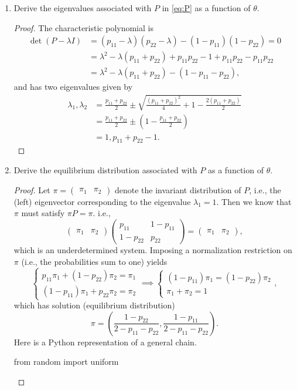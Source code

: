 \documentclass[oneside,reqno]{amsart}
\theoremstyle{definition}
\begin{document}
\begin{enumerate}[label=(\roman*)]
\item
Derive the eigenvalues associated with $P$ in \eqref{eq:P} as a function of $\theta$. 
\begin{proof}
The characteristic polynomial is
\begin{align*}
	\det(P - \lambda I) &= (p_{11} - \lambda )(p_{22} - \lambda) - (1-p_{11})(1-p_{22}) = 0 \\
	& = \lambda^2 - \lambda (p_{11} + p_{22}) + p_{11}p_{22} - 1 + p_{11} p_{22} - p_{11}p_{22} \\
	& = \lambda^2 - \lambda (p_{11} + p_{22}) - (1 - p_{11} - p_{22}),
\end{align*}
and has two eigenvalues given by
\begin{align*}
	\lambda_1, \lambda_2 &= \frac{p_{11} + p _{22}}{2} \pm \sqrt{\frac{(p_{11} + p _{22})^2}{4} +1 - \frac{2(p_{11} + p _{22})}{2}} \\
	&= \frac{p_{11} + p _{22}}{2} \pm \left(1 - \frac{p_{11} + p _{22}}{2} \right) \\
	&= 1, p_{11}+p_{22}-1.
\end{align*}
\end{proof}
\item
Derive the equilibrium distribution associated with $P$ as a function of $\theta$.
\begin{proof}
Let $\pi = \begin{pmatrix} \pi_1 & \pi_2\end{pmatrix}$ denote the invariant distribution of $P$, i.e., the (left) eigenvector corresponding to the eigenvalue $\lambda_1 = 1$. Then we know that $\pi$ must satisfy $\pi P = \pi$. i.e.,
\[
	\begin{pmatrix}
		\pi_1 & \pi_2
	\end{pmatrix}
	 \begin{pmatrix}
		p_{11} & 1-p_{11} \\
		1- p_{22} & p_{22}
	\end{pmatrix}
	=\begin{pmatrix}
		\pi_1 & \pi_2
	\end{pmatrix},
\]
which is an underdetermined system. Imposing a normalization restriction on $\pi$ (i.e., the probabilities sum to one) yields
\[
	\begin{cases}
		p_{11} \pi_1 + (1- p_{22}) \pi_2 = \pi_1 \\
		(1-p_{11}) \pi_1 + p_{22} \pi_2 = \pi_2
	\end{cases}
	\implies  
	\begin{cases}
		(1-p_{11}) \pi_1 =  (1- p_{22}) \pi_2 \\
		\pi_1 + \pi_2 = 1
	\end{cases},
\]
which has solution (equilibrium distribution)
\[
	\pi = \left(\frac{1-p_{22}}{2-p_{11}  - p_{22}}, \frac{1-p_{11}}{2-p_{11} - p_{22}} \right).
\]
Here is a Python representation of a general chain.
\begin{python3code}
from random import uniform


\end{python3code}
\end{proof}
\end{enumerate}
\end{document}
